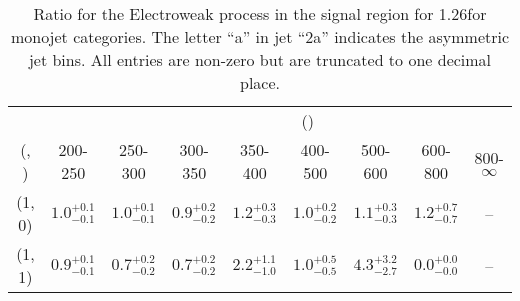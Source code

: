 \begin{table}[h!]
\tiny
\centering
\caption{Ratio for the Electroweak process in the signal region for 1.26\ifb for monojet categories. The letter ``a'' in jet \eg ``2a''  indicates the asymmetric jet bins. All entries are non-zero but are truncated to one decimal place.\label{tab:ratiosep_sig_ewk_mono}}
\begin{tabular}
{ccccccccc}
	\hline\hline
&	& \multicolumn{8}{c}{\scalht (\gev)} \\ 
	 (\njet,  \nb) & 200-250 & 250-300 & 300-350 & 350-400 & 400-500 & 500-600 & 600-800 & 800-$\infty$ \\ [0.8ex] 
\hline
	(1, 0) & $1.0^{+ 0.1 }_{- 0.1 }$ & $1.0^{+ 0.1 }_{- 0.1 }$ & $0.9^{+ 0.2 }_{- 0.2 }$ & $1.2^{+ 0.3 }_{- 0.3 }$ & $1.0^{+ 0.2 }_{- 0.2 }$ & $1.1^{+ 0.3 }_{- 0.3 }$ & $1.2^{+ 0.7 }_{- 0.7 }$ & -- \\[0.5ex] 
	(1, 1) & $0.9^{+ 0.1 }_{- 0.1 }$ & $0.7^{+ 0.2 }_{- 0.2 }$ & $0.7^{+ 0.2 }_{- 0.2 }$ & $2.2^{+ 1.1 }_{- 1.0 }$ & $1.0^{+ 0.5 }_{- 0.5 }$ & $4.3^{+ 3.2 }_{- 2.7 }$ & $0.0^{+ 0.0 }_{- 0.0 }$ & -- \\[0.5ex] 
	\hline
	\hline
\end{tabular}
\end{table}
